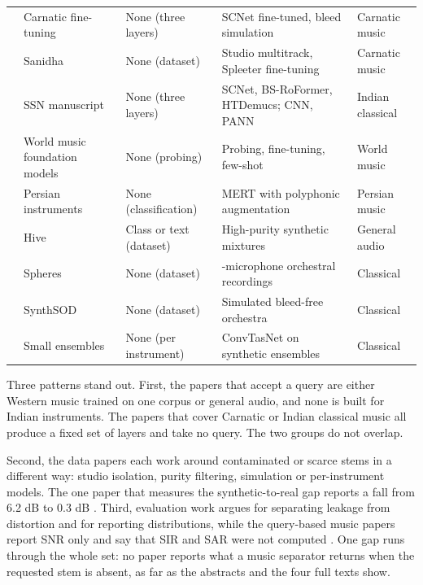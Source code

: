 \documentclass[12pt,a4paper]{article}
\begin{document}
\begin{longtable}{@{}>{\raggedright\arraybackslash}p{0.9cm}>{\raggedright\arraybackslash}p{3.3cm}>{\raggedright\arraybackslash}p{3.5cm}>{\raggedright\arraybackslash}p{4.4cm}>{\raggedright\arraybackslash}p{2.7cm}@{}}
\cite{carnaticft} & Carnatic fine-tuning & None (three layers) & SCNet fine-tuned, bleed simulation & Carnatic music \\
\cite{sanidha} & Sanidha & None (dataset) & Studio multitrack, Spleeter fine-tuning & Carnatic music \\
\cite{ssn} & SSN manuscript & None (three layers) & SCNet, BS-RoFormer, HTDemucs; CNN, PANN & Indian classical \\
\cite{worldmusic} & World music foundation models & None (probing) & Probing, fine-tuning, few-shot & World music \\
\cite{persian} & Persian instruments & None (classification) & MERT with polyphonic augmentation & Persian music \\
\cite{hive} & Hive & Class or text (dataset) & High-purity synthetic mixtures & General audio \\
\cite{spheres} & Spheres & None (dataset) & 23-microphone orchestral recordings & Classical \\
\cite{synthsod} & SynthSOD & None (dataset) & Simulated bleed-free orchestra & Classical \\
\cite{ensembles} & Small ensembles & None (per instrument) & ConvTasNet on synthetic ensembles & Classical \\
\end{longtable}\endgroup

Three patterns stand out. First, the papers that accept a query \cite{banquet,hyperell,qscnet,clapsep,pmq} are either Western music trained on one corpus or general audio, and none is built for Indian instruments. The papers that cover Carnatic or Indian classical music \cite{carnaticft,sanidha,ssn} all produce a fixed set of layers and take no query. The two groups do not overlap.

Second, the data papers \cite{sanidha,hive,spheres,synthsod,ensembles} each work around contaminated or scarce stems in a different way: studio isolation, purity filtering, simulation or per-instrument models. The one paper that measures the synthetic-to-real gap reports a fall from 6.2 dB to 0.3 dB \cite{ensembles}. Third, evaluation work \cite{mapss,perceptual} argues for separating leakage from distortion and for reporting distributions, while the query-based music papers report SNR only and say that SIR and SAR were not computed \cite{banquet}. One gap runs through the whole set: no paper reports what a music separator returns when the requested stem is absent, as far as the abstracts and the four full texts show.
\end{document}
